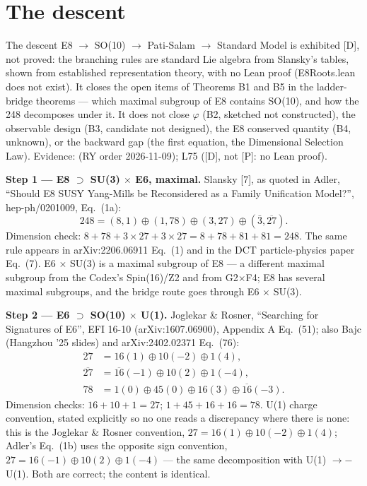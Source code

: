 \documentclass{alienfolio}
\begin{document}
\section{The descent}
\label{sec:descent}
The descent E8 $\to$ SO(10) $\to$ Pati-Salam $\to$ Standard Model is exhibited [D], not proved: the branching rules are standard Lie algebra from Slansky's tables, shown from established representation theory, with no Lean proof (E8Roots.lean does not exist). It closes the open items of Theorems B1 and B5 in the ladder-bridge theorems --- which maximal subgroup of E8 contains SO(10), and how the 248 decomposes under it. It does not close $\varphi$ (B2, sketched not constructed), the observable design (B3, candidate not designed), the E8 conserved quantity (B4, unknown), or the backward gap (the first equation, the Dimensional Selection Law). Evidence:  (RY order 2026-11-09);  L75 ([D], not [P]: no Lean proof).

\noindent\textbf{Step 1 --- E8 $\supset$ SU(3) $\times$ E6, maximal.} Slansky [7], as quoted in Adler, ``Should E8 SUSY Yang-Mills be Reconsidered as a Family Unification Model?'', hep-ph/0201009, Eq.~(1a):
\[
248 = (8,1) \oplus (1,78) \oplus (3,27) \oplus (\bar{3},\overline{27}).
\]
Dimension check: $8 + 78 + 3 \times 27 + 3 \times 27 = 8 + 78 + 81 + 81 = 248$. The same rule appears in arXiv:2206.06911 Eq.~(1) and in the DCT particle-physics paper Eq.~(7). E6 $\times$ SU(3) is a maximal subgroup of E8 --- a different maximal subgroup from the Codex's Spin(16)/Z2 and from G2$\times$F4; E8 has several maximal subgroups, and the bridge route goes through E6 $\times$ SU(3).

\noindent\textbf{Step 2 --- E6 $\supset$ SO(10) $\times$ U(1).} Joglekar \& Rosner, ``Searching for Signatures of E6'', EFI 16-10 (arXiv:1607.06900), Appendix A Eq.~(51); also Bajc (Hangzhou '25 slides) and arXiv:2402.02371 Eq.~(76):
\[
\begin{aligned}
27 &= 16(1) \oplus 10(-2) \oplus 1(4), \\
\overline{27} &= \overline{16}(-1) \oplus 10(2) \oplus 1(-4), \\
78 &= 1(0) \oplus 45(0) \oplus 16(3) \oplus \overline{16}(-3).
\end{aligned}
\]
Dimension checks: $16 + 10 + 1 = 27$; $1 + 45 + 16 + 16 = 78$. U(1) charge convention, stated explicitly so no one reads a discrepancy where there is none: this is the Joglekar \& Rosner convention, $27 = 16(1) \oplus 10(-2) \oplus 1(4)$; Adler's Eq.~(1b) uses the opposite sign convention, $27 = 16(-1) \oplus 10(2) \oplus 1(-4)$ --- the same decomposition with U(1) $\to -$U(1). Both are correct; the content is identical.
\end{document}
